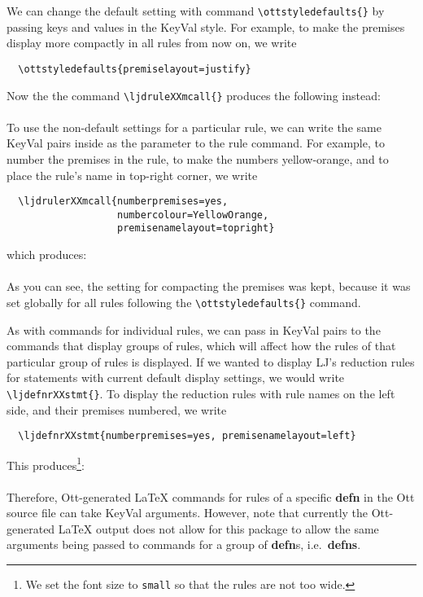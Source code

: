 \documentclass{article}
\begin{document}
We can change the default setting with command \verb+\ottstyledefaults{}+ by
passing keys and values in the KeyVal style. For example, to make the premises
display more compactly in all rules from now on, we write
%
\begin{verbatim}
  \ottstyledefaults{premiselayout=justify}
\end{verbatim}
%
Now the the command \verb+\ljdruleXXmcall{}+ produces the following instead:\\[2ex]
\ljdrulerXXmcall{}\\[2ex]

To use the non-default settings for a particular rule, we can write the same
KeyVal pairs inside as the parameter to the rule command. For example, to number
the premises in the rule, to make the numbers yellow-orange, and to place the
rule's name in top-right corner, we write
%
\begin{verbatim}
  \ljdrulerXXmcall{numberpremises=yes,
                   numbercolour=YellowOrange,
                   premisenamelayout=topright}
\end{verbatim}
%
which produces:\\[2ex]
\\[2ex]
%
As you can see, the setting for compacting the premises was kept, because it was
set globally for all rules following the \verb+\ottstyledefaults{}+ command.

As with commands for individual rules, we can pass in KeyVal pairs to the
commands that display groups of rules, which will affect how the rules of that
particular group of rules is displayed. If we wanted to display LJ's
reduction rules for statements with current default display settings, we would
write \verb+\ljdefnrXXstmt{}+. To display the reduction rules with rule names on
the left side, and their premises numbered, we write
%
\begin{verbatim}
  \ljdefnrXXstmt{numberpremises=yes, premisenamelayout=left}
\end{verbatim}
%
This produces\footnote{We set the font size to {\tt small} so that the rules
  are not too wide.}:\\[2ex]
{\small{}}\\[2ex]
%
Therefore, Ott-generated \LaTeX{} commands for rules of a specific {\bf defn} in
the Ott source file can take KeyVal arguments. However, note that currently the
Ott-generated \LaTeX{} output does not allow for this package to allow the same
arguments being passed to commands for a group of {\bf defn}s, i.e.~{\bf defns}.



\end{document}
